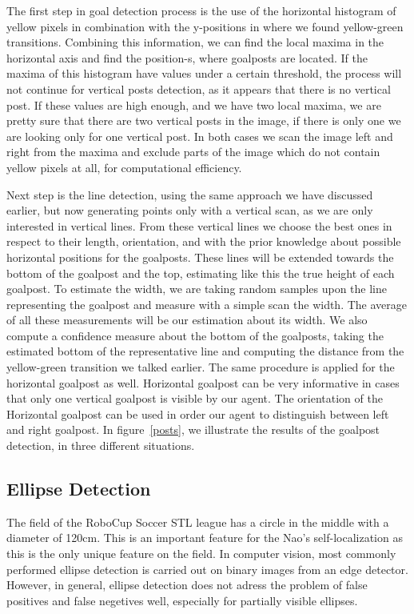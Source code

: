 \documentclass[	DIV=calc,%
							paper=a4,%
							fontsize=9pt,%
							twocolumn]{scrartcl}	 					%
\begin{document}
The first step in goal detection process is the use of the horizontal histogram of yellow pixels in combination with the y-positions in where we found yellow-green transitions. Combining this information, we can find the local maxima in the horizontal axis and find the position-s, where goalposts are located. If the maxima of this histogram have values under a certain threshold, the process will not continue for vertical posts detection, as it appears that there is no vertical post. If these values are high enough, and we have two local maxima, we are pretty sure that there are two vertical posts in the image, if there is only one we are looking only for one vertical post. In both cases we scan the image left and right from the maxima and exclude parts of the image which do not contain yellow pixels at all, for computational efficiency.

Next step is the line detection, using the same approach we have discussed earlier, but now generating points only with a vertical scan, as we are only interested in vertical lines. From these vertical lines we choose the best ones in respect to their length, orientation, and with the prior knowledge about possible horizontal positions for the goalposts. These lines will be extended towards the bottom of the goalpost and the top, estimating like this the true height of each goalpost. To estimate the width, we are taking random samples upon the line representing the goalpost and measure with a simple scan the width. The average of all these measurements will be our estimation about its width. We also compute a confidence measure about the bottom of the goalposts, taking the estimated bottom of the representative line and computing the distance from the yellow-green transition we talked earlier. The same procedure is applied for the horizontal goalpost as well. Horizontal goalpost can be very informative in cases that only one vertical goalpost is visible by our agent. The orientation of the Horizontal goalpost can be used in order our agent to distinguish between left and right goalpost. In figure~\ref{posts}, we illustrate the results of the goalpost detection, in three different situations.


\subsection{Ellipse Detection}
The field of the RoboCup Soccer STL league has a circle in the middle with a diameter of 120cm. This is an important feature for the Nao's self-localization as this is the only unique feature on the field. In computer vision, most commonly performed ellipse detection is carried out on binary images from an edge detector. However, in general, ellipse detection does not adress the problem of false positives and false negetives well, especially for partially visible ellipses.
\end{document}
